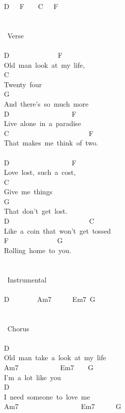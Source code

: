 {D\ \ \ F\ \ \ \ C\ \ \ F\\
\\
\\
\lbrack\ Verse\rbrack\\
\\
D\ \ \ \ \ \ \ \ \ \ \ \ \ \ F\\
Old\ man\ look\ at\ my\ life,\\
C\\
Twenty\ four\\
G\\
And\ there's\ so\ much\ more\\
D\ \ \ \ \ \ \ \ \ \ \ \ \ \ \ \ \ \ F\\
Live\ alone\ in\ a\ paradise\\
C\ \ \ \ \ \ \ \ \ \ \ \ \ \ \ \ \ \ \ \ \ \ \ F\\
That\ makes\ me\ think\ of\ two.\\
\\
D\ \ \ \ \ \ \ \ \ \ \ \ \ \ \ \ \ \ F\\
Love\ lost,\ such\ a\ cost,\\
C\\
Give\ me\ things\\
G\\
That\ don't\ get\ lost.\\
D\ \ \ \ \ \ \ \ \ \ \ \ \ \ \ \ \ \ \ \ \ \ \ C\\
Like\ a\ coin\ that\ won't\ get\ tossed\\
F\ \ \ \ \ \ \ \ \ \ \ \ \ \ G\\
Rolling\ home\ to\ you.\\
\\
\\
\lbrack\ Instrumental\rbrack\\
\\
D\ \ \ \ \ \ \ \ Am7\ \ \ \ \ \ Em7\ G\\
\\
\\
\lbrack\ Chorus\rbrack\\
\\
D\\
Old\ man\ take\ a\ look\ at\ my\ life\\
Am7\ \ \ \ \ \ \ \ \ \ \ \ Em7\ \ \ \ G\\
I'm\ a\ lot\ like\ you\\
D\ \\
I\ need\ someone\ to\ love\ me\\
Am7\ \ \ \ \ \ \ \ \ \ \ \ \ \ \ \ \ \ Em7\ \ \ \ \ \ G\\
}

